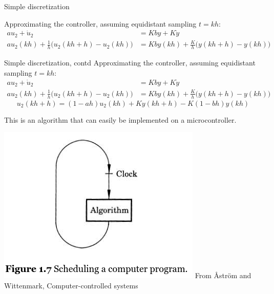 \documentclass[presentation,aspectratio=169]{beamer}
\begin{document}
\begin{frame}[label={sec:orga251b49}]{Simple discretization}
\begin{center}
\end{center}

Approximating the controller, assuming equidistant sampling  \(t = kh\):
\begin{align*}
a u_2 + \dot{u}_2 &= Kby + K\dot{y}\\
a u_2(kh) + \frac{1}{h} \big(u_2(kh+h) - u_2(kh)\big) &= Kby(kh) + \frac{K}{h}\big(y(kh+h) - y(kh)\big)
\end{align*}
\end{frame}

\begin{frame}[label={sec:org66749d5}]{Simple discretization, contd}
Approximating the controller, assuming equidistant sampling  \(t = kh\):
\begin{align*}
a u_2 + \dot{u}_2 &= Kby + K\dot{y}\\
a u_2(kh) + \frac{1}{h} \big(u_2(kh+h) - u_2(kh)\big) &= Kby(kh) + \frac{K}{h}\big(y(kh+h) - y(kh)\big)
\end{align*}
\[ u_2(kh+h) = (1-ah)u_2(kh) + Ky(kh+h) - K(1-bh)y(kh) \]

This is an algorithm that can easily be implemented on a microcontroller. 
\begin{center}
\includegraphics[width=0.35\linewidth]{../../figures/fig1-7.png} \tiny From Åström and Wittenmark, Computer-controlled systems
\end{center}
\end{frame}
\end{document}
